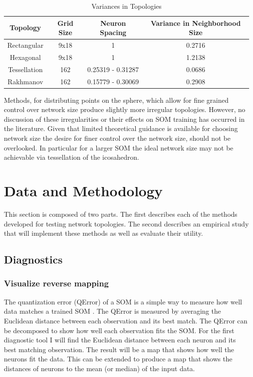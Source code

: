 \documentclass[10pt,titlepage]{article}
\begin{document}
\begin{table}[htbp]
\caption{Variances in Topologies}
\begin{center}
\begin{tabular}{|c|c|c|c|}
\hline
Topology&Grid Size&Neuron Spacing&Variance in Neighborhood Size\\
\hline
Rectangular&9x18&1&0.2716\\
Hexagonal&9x18&1&1.2138\\
Tessellation&162&0.25319 - 0.31287& 0.0686\\
Rakhmanov&162&0.15779 - 0.30069& 0.2908\\
\hline
\end{tabular}
\end{center}
\label{table1}
\end{table}

Methods, for distributing points on the sphere, which allow for fine grained
control over network size produce slightly more irregular topologies.  However,
no discussion of these irregularities or their effects on SOM training has
occurred in the literature. Given that limited theoretical guidance is available
for choosing network size the desire for finer control over the network size,
should not be overlooked. In particular for a larger SOM the ideal network size
may not be achievable via tessellation of the icosahedron.

\section{Data and Methodology}
This section is composed of two parts.  The first describes each of
the methods developed for testing network topologies.  The second describes an
empirical study that will implement these methods as well as evaluate their
utility. 

\subsection{Diagnostics}
\subsubsection{Visualize reverse mapping}
The quantization error (QError) of a SOM is a simple way to measure how well 
data matches a trained SOM \citep{Kohonen2000}. The QError is measured by averaging
the Euclidean distance between each observation and its best match.  The QError can
be decomposed to show how well each observation fits the SOM.  For the first
diagnostic tool I will find the Euclidean distance between each neuron and its
best matching observation.  The result will be a map that shows how well the
neurons fit the data. This can be extended to produce a map that shows the
distances of neurons to the mean (or median) of the input data.
\end{document}
